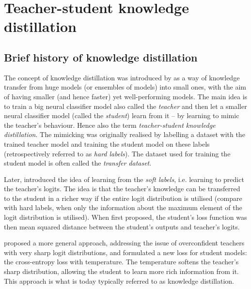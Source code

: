 \documentclass[bsc,frontabs,twoside,singlespacing,parskip,deptreport]{infthesis}
\begin{document}
{  \section{Teacher-student knowledge distillation}{
    \subsection{Brief history of knowledge distillation}{
      The concept of knowledge distillation was introduced by \citep{Bucila_2006} as a way of knowledge transfer from huge models (or ensembles of models) into small ones, with the aim of having smaller (and hence faster) yet well-performing models.
      The main idea is to train a big neural classifier model also called the \textit{teacher} and then let a smaller neural classifier model (called the \textit{student}) learn from it -- by learning to mimic the teacher's behaviour. Hence also the term \textit{teacher-student knowledge distillation}.
      The mimicking was originally realised by labelling a dataset with the trained teacher model and training the student model on these labels (retrospectively referred to as \textit{hard labels}). The dataset used for training the student model is often called the \textit{transfer dataset}.

      Later, \citet{Ba_2013} introduced the idea of learning from the \textit{soft labels}, i.e. learning to predict the teacher's logits. The idea is that the teacher's knowledge can be transferred to the student in a richer way if the entire logit distribution is utilised (compare with hard labels, when only the information about the maximum element of the logit distribution is utilised). When first proposed, the student's loss function was then mean squared distance between the student's outputs and teacher's logits.

      \citet{Hinton_2015} proposed a more general approach, addressing the issue of overconfident teachers with very sharp logit distributions, and formulated a new loss for student models: the cross-entropy loss with temperature. The temperature softens the teacher's sharp distribution, allowing the student to learn more rich information from it. This approach is what is today typically referred to as knowledge distillation.

}}}
\end{document}
